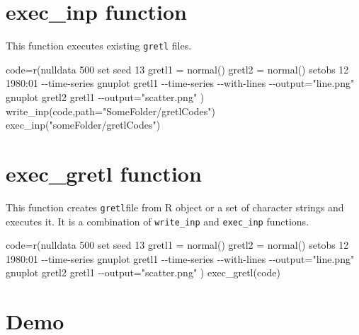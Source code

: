 \documentclass[
  letterpaper,
  DIV=11,
  numbers=noendperiod]{scrartcl}
\newenvironment{Shaded}{\begin{snugshade}}{\end{snugshade}}
\newcommand{\AttributeTok}[1]{\textcolor[rgb]{0.40,0.45,0.13}{#1}}
\newcommand{\FunctionTok}[1]{\textcolor[rgb]{0.28,0.35,0.67}{#1}}
\newcommand{\NormalTok}[1]{\textcolor[rgb]{0.00,0.23,0.31}{#1}}
\newcommand{\OtherTok}[1]{\textcolor[rgb]{0.00,0.23,0.31}{#1}}
\newcommand{\StringTok}[1]{\textcolor[rgb]{0.13,0.47,0.30}{#1}}
\begin{document}
\hypertarget{exec_inp-function}{%
\section{exec\_inp function}\label{exec_inp-function}}

This function executes existing \texttt{gretl} files.

\begin{Shaded}
\begin{Highlighting}[]
\NormalTok{code}\OtherTok{=}\NormalTok{r}\StringTok{\textquotesingle{}(nulldata 500}
\StringTok{set seed 13}
\StringTok{gretl1 = normal()}
\StringTok{gretl2 = normal()}
\StringTok{setobs 12 1980:01 {-}{-}time{-}series}
\StringTok{gnuplot gretl1 {-}{-}time{-}series {-}{-}with{-}lines {-}{-}output="line.png"}
\StringTok{gnuplot gretl2 gretl1 {-}{-}output="scatter.png"}
\StringTok{ )\textquotesingle{}}
\FunctionTok{write\_inp}\NormalTok{(code,}\AttributeTok{path=}\StringTok{"SomeFolder/gretlCodes"}\NormalTok{)}
\FunctionTok{exec\_inp}\NormalTok{(}\StringTok{"someFolder/gretlCodes"}\NormalTok{)}
\end{Highlighting}
\end{Shaded}

\hypertarget{exec_gretl-function}{%
\section{exec\_gretl function}\label{exec_gretl-function}}

This function creates \texttt{gretl}file from R object or a set of
character strings and executes it. It is a combination of
\texttt{write\_inp} and \texttt{exec\_inp} functions.

\begin{Shaded}
\begin{Highlighting}[]
\NormalTok{code}\OtherTok{=}\NormalTok{r}\StringTok{\textquotesingle{}(nulldata 500}
\StringTok{set seed 13}
\StringTok{gretl1 = normal()}
\StringTok{gretl2 = normal()}
\StringTok{setobs 12 1980:01 {-}{-}time{-}series}
\StringTok{gnuplot gretl1 {-}{-}time{-}series {-}{-}with{-}lines {-}{-}output="line.png"}
\StringTok{gnuplot gretl2 gretl1 {-}{-}output="scatter.png"}
\StringTok{ )\textquotesingle{}}
\FunctionTok{exec\_gretl}\NormalTok{(code)}
\end{Highlighting}
\end{Shaded}

\hypertarget{demo}{%
\section{Demo}\label{demo}}
\end{document}

